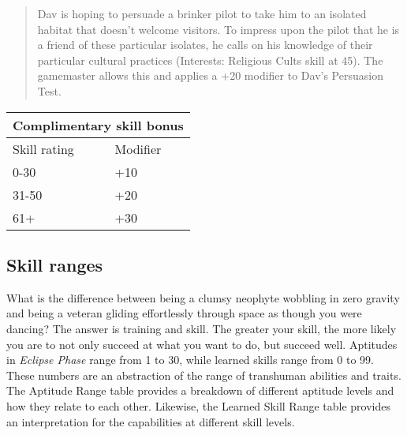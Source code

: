 \begin{quotation}
Dav is hoping to persuade a brinker pilot to take him to an isolated habitat that doesn’t welcome visitors. To impress upon the pilot that he is a friend of these particular isolates, he calls on his knowledge of their particular cultural practices (Interests: Religious Cults skill at 45). The gamemaster allows this and applies a +20 modifier to Dav’s Persuasion Test.
\end{quotation}

\begin{tabular}{|l|l|}
\hline
\multicolumn{2}{|c|}{Complimentary skill bonus} \\
\hline
Skill rating & Modifier \\
\hline
0-30		& +10 \\
31-50	& +20 \\
61+		& +30 \\
\hline
\end{tabular}


\subsection{Skill ranges}
\label{sec:skillranges}

What is the difference between being a clumsy neophyte
wobbling in zero gravity and being a veteran
gliding effortlessly through space as though you were
dancing? The answer is training and skill. The greater
your skill, the more likely you are to not only succeed
at what you want to do, but succeed well.
Aptitudes in \emph{Eclipse Phase} range from 1 to 30,
while learned skills range from 0 to 99. These numbers
are an abstraction of the range of transhuman
abilities and traits. The Aptitude Range table provides
a breakdown of different aptitude levels and how they
relate to each other. Likewise, the Learned Skill Range
table provides an interpretation for the capabilities at
different skill levels.

